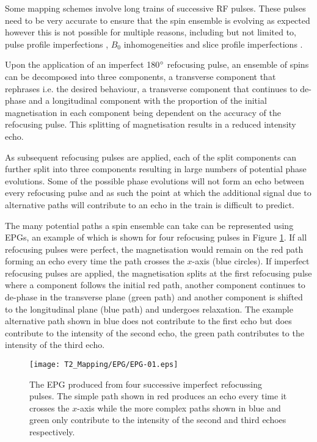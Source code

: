 Some \ttwo mapping schemes involve long trains of successive  \ac{RF} pulses. These pulses need to be very accurate to ensure that the spin ensemble is evolving as expected however this is not possible for multiple reasons, including but not limited to, pulse profile imperfections \cite{majumdar_errors_1986}, $B_0$ inhomogeneities \cite{majumdar_errors_1986-1} and slice profile imperfections \cite{crawley_errors_1987}.

Upon the application of an imperfect 180$\degree$ refocusing pulse, an ensemble of spins can be decomposed into three components, a transverse component that rephrases i.e. the desired behaviour, a transverse component that continues to de-phase and a longitudinal component with the proportion of the initial magnetisation in each component being dependent on the accuracy of the refocusing pulse. This splitting of magnetisation results in a reduced intensity echo. 

As subsequent refocusing pulses are applied, each of the split components can further split into three components resulting in large numbers of potential phase evolutions. Some of the possible phase evolutions will not form an echo between every refocusing pulse and as such the point at which the additional signal due to alternative paths will contribute to an echo in the train is difficult to predict. 

The many potential paths a spin ensemble can take can be represented using \acp{EPG}, an example of which is shown for four refocusing pulses in Figure \ref{fig:t2_epg}. If all refocusing pulses were perfect, the magnetisation would remain on the red path forming an echo every time the path crosses the $x$-axis (blue circles). If imperfect refocusing pulses are applied, the magnetisation splits at the first refocusing pulse where a component follows the initial red path, another component continues to de-phase in the transverse plane (green path) and another component is shifted to the longitudinal plane (blue path) and undergoes \tone relaxation. The example alternative path shown in blue does not contribute to the first echo but does contribute to the intensity of the second echo, the green path contributes to the intensity of the third echo.

\begin{figure}[H]
	\centering
	\texttt{[image: T2\_Mapping/EPG/EPG-01.eps]}
	\caption{The \ac{EPG} produced from four successive imperfect refocussing pulses. The simple path shown in red produces an echo every time it crosses the $x$-axis while the more complex paths shown in blue and green only contribute to the intensity of the second and third echoes respectively.}
	\label{fig:t2_epg}	
\end{figure}

